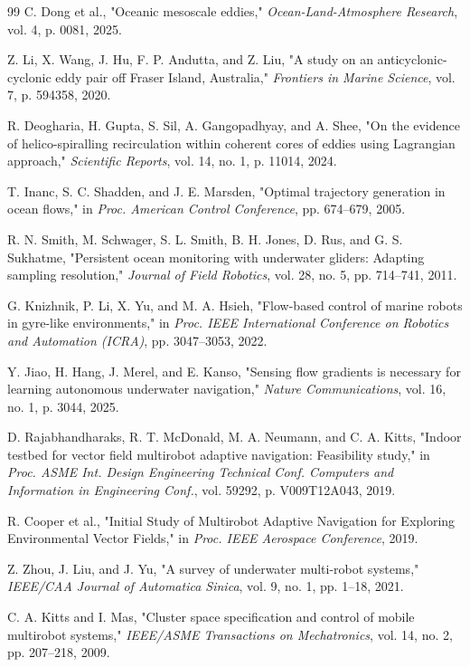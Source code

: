 \documentclass[lettersize,journal]{IEEEtran}
\begin{document}
\begin{thebibliography}{99}
 C. Dong et al., "Oceanic mesoscale eddies," \textit{Ocean-Land-Atmosphere Research}, vol. 4, p. 0081, 2025.

 Z. Li, X. Wang, J. Hu, F. P. Andutta, and Z. Liu, "A study on an anticyclonic-cyclonic eddy pair off Fraser Island, Australia," \textit{Frontiers in Marine Science}, vol. 7, p. 594358, 2020.

 R. Deogharia, H. Gupta, S. Sil, A. Gangopadhyay, and A. Shee, "On the evidence of helico-spiralling recirculation within coherent cores of eddies using Lagrangian approach," \textit{Scientific Reports}, vol. 14, no. 1, p. 11014, 2024.

 T. Inanc, S. C. Shadden, and J. E. Marsden, "Optimal trajectory generation in ocean flows," in \textit{Proc. American Control Conference}, pp. 674--679, 2005.

 R. N. Smith, M. Schwager, S. L. Smith, B. H. Jones, D. Rus, and G. S. Sukhatme, "Persistent ocean monitoring with underwater gliders: Adapting sampling resolution," \textit{Journal of Field Robotics}, vol. 28, no. 5, pp. 714--741, 2011.

 G. Knizhnik, P. Li, X. Yu, and M. A. Hsieh, "Flow-based control of marine robots in gyre-like environments," in \textit{Proc. IEEE International Conference on Robotics and Automation (ICRA)}, pp. 3047--3053, 2022.

 Y. Jiao, H. Hang, J. Merel, and E. Kanso, "Sensing flow gradients is necessary for learning autonomous underwater navigation," \textit{Nature Communications}, vol. 16, no. 1, p. 3044, 2025.

 D. Rajabhandharaks, R. T. McDonald, M. A. Neumann, and C. A. Kitts, "Indoor testbed for vector field multirobot adaptive navigation: Feasibility study," in \textit{Proc. ASME Int. Design Engineering Technical Conf. Computers and Information in Engineering Conf.}, vol. 59292, p. V009T12A043, 2019.

 R. Cooper et al., "Initial Study of Multirobot Adaptive Navigation for Exploring Environmental Vector Fields," in \textit{Proc. IEEE Aerospace Conference}, 2019.

 Z. Zhou, J. Liu, and J. Yu, "A survey of underwater multi-robot systems," \textit{IEEE/CAA Journal of Automatica Sinica}, vol. 9, no. 1, pp. 1--18, 2021.

 C. A. Kitts and I. Mas, "Cluster space specification and control of mobile multirobot systems," \textit{IEEE/ASME Transactions on Mechatronics}, vol. 14, no. 2, pp. 207--218, 2009.


\end{thebibliography}
\end{document}
